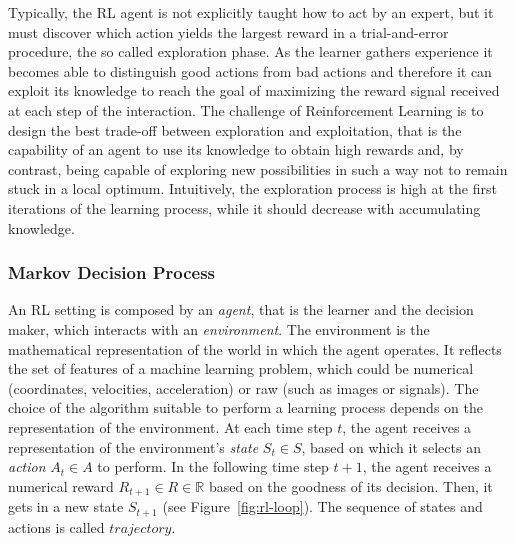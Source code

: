 Typically, the RL agent is not explicitly taught how to act by an expert, but it must discover which action yields the largest reward in a trial-and-error procedure, the so called exploration phase. As the learner gathers experience it becomes able to distinguish good actions from bad actions and therefore it can exploit its knowledge to reach the goal of maximizing the reward signal received at each step of the interaction.
The challenge of Reinforcement Learning is to design the best trade-off between exploration and exploitation, that is the capability of an agent to use its knowledge to obtain high rewards and, by contrast, being capable of exploring new possibilities in such a way not to remain stuck in a local optimum. Intuitively, the exploration process is high at the first iterations of the learning process, while it should decrease with accumulating knowledge.

\subsubsection{Markov Decision Process}
An RL setting is composed by an \textit{agent}, that is the learner and the decision maker, which interacts with an \textit{environment}. The environment is the mathematical representation of the world in which the agent operates. It reflects the set of features of a machine learning problem, which could be numerical (coordinates, velocities, acceleration) or raw (such as images or signals). The choice of the algorithm suitable to perform a learning process depends on the representation of the environment. At each time step $t$, the agent receives a representation of the environment's \textit{state} $S_t \in S$, based on which it selects an \textit{action} $A_t \in A$ to perform. In the following time step $t+1$, the agent receives a numerical reward $R_{t+1} \in R \in \mathbb{R}$ based on the goodness of its decision. Then, it gets in a new state $S_{t+1}$ (see Figure~\ref{fig:rl-loop}). The sequence of states and actions is called $trajectory$.

